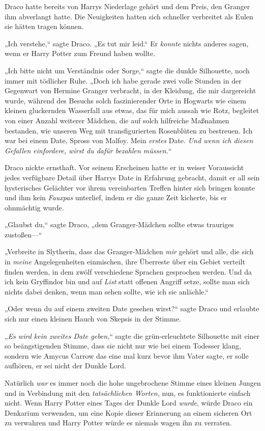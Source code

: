 {Draco hatte bereits von Harrys Niederlage gehört und dem Preis, den Granger ihm abverlangt hatte. Die Neuigkeiten hatten sich schneller verbreitet als Eulen sie hätten tragen können.

„Ich verstehe,“ sagte Draco. „Es tut mir leid.“ Er \emph{konnte} nichts anderes sagen, wenn er Harry Potter zum Freund haben wollte.

„Ich bitte nicht um Verständnis oder Sorge,“ sagte die dunkle Silhouette, noch immer mit tödlicher Ruhe. „Doch ich habe gerade zwei volle Stunden in der Gegenwart von Hermine Granger verbracht, in der Kleidung, die mir dargereicht wurde, während des Besuchs solch faszinierender Orte in Hogwarts wie einem kleinen gluckernden Wasserfall aus etwas, das für mich aussah wie Rotz, begleitet von einer Anzahl weiterer Mädchen, die auf solch hilfreiche Maßnahmen bestanden, wie unseren Weg mit transfigurierten Rosenblüten zu bestreuen. Ich war bei einem Date, Spross von Malfoy. Mein \emph{erstes} Date. \emph{Und wenn ich diesen Gefallen einfordere, wirst du dafür bezahlen müssen.}“

Draco nickte ernsthaft. Vor seinem Erscheinen hatte er in weiser Voraussicht jedes verfügbare Detail über Harrys Date in Erfahrung gebracht, damit er all sein hysterisches Gelächter vor ihrem vereinbarten Treffen hinter sich bringen konnte und ihm kein \emph{Fauxpas} unterlief, indem er die ganze Zeit kicherte, bis er ohnmächtig wurde.

„Glaubst du,“ sagte Draco, „dem Granger-Mädchen sollte etwas trauriges zustoßen—“

„Verbreite in Slytherin, dass das Granger-Mädchen \emph{mir} gehört und alle, die sich in \emph{meine} Angelegenheiten einmischen, ihre Überreste über ein Gebiet verteilt finden werden, in dem zwölf verschiedene Sprachen gesprochen werden. Und da ich kein Gryffindor bin und auf \emph{List} statt offenen Angriff setze, sollte man sich nichts dabei denken, wenn man sehen sollte, wie ich sie anlächle.“

„Oder wenn du auf einem zweiten Date gesehen wirst?“ sagte Draco und erlaubte sich nur einen kleinen Hauch von Skepsis in der Stimme.

„\emph{Es wird kein zweites Date geben,}“ sagte die grün-erleuchtete Silhouette mit einer so beängstigenden Stimme, dass sie nicht nur wie bei einem Todesser klang, sondern wie Amycus Carrow das eine mal kurz bevor ihm Vater sagte, er solle aufhören, er sei nicht der Dunkle Lord.

Natürlich \emph{war} es immer noch die hohe ungebrochene Stimme eines kleinen Jungen und in Verbindung mit den \emph{tatsächlichen Worten,} nun, es funktionierte einfach nicht. Wenn Harry Potter eines Tages der Dunkle Lord \emph{wurde}, würde Draco ein Denkarium verwenden, um eine Kopie dieser Erinnerung an einem sicheren Ort zu verwahren und Harry Potter würde es niemals wagen ihn zu verraten.

}
